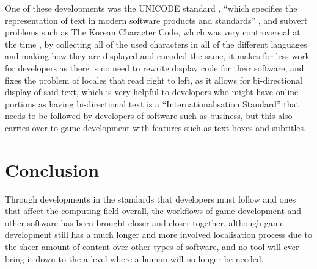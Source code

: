 \documentclass{scrartcl}
\begin{document}
\noindent One of these developments was the UNICODE standard \cite{unicodestandards}, ``which specifies the representation of text in modern software products and standards'' \cite[pg.6]{schaler2004language}, and subvert problems such as The Korean Character Code\cite{park2016korean}, which was very controversial at the time , by collecting all of the used characters in all of the different languages and making how they are displayed and encoded the same, it makes for less work for developers as there is no need to rewrite display code for their software, and fixes the problem of locales that read right to left, as it allows for bi-directional display of said text\cite{bi-directional}, which is very helpful to developers who might have online portions as having bi-directional text is a ``Internationalisation Standard'' \cite{standards} that needs to be followed by developers of software such as business, but this also carries over to game development with features such as text boxes and subtitles.  

\section{Conclusion}
Through developments in the standards that developers must follow and ones that affect the computing field overall, the workflows of game development and other software has been brought closer and closer together, although game development still has a much longer and more involved localisation process due to the sheer amount of content over other types of software, and no tool will ever bring it down to the a level where a human will no longer be needed.

\raggedright


\end{document}

